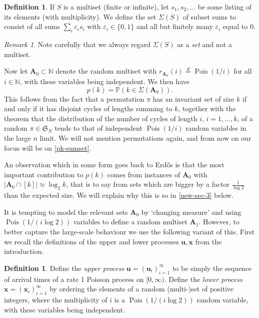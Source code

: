 \documentclass[11pt,reqno]{amsart}
\numberwithin{equation}{section}
\theoremstyle{definition}
\newtheorem{definition}[theorem]{Definition}
\theoremstyle{remark}
\newtheorem*{remark}{Remark}
\newcommand{\mb}{\mathbb}
\newcommand{\mbf}{\mathbf}
\newcommand{\mf}{\mathfrak}
\newcommand{\eps}{\varepsilon}
\newcommand\Pois{\operatorname{Pois}}
\newcommand\N{\mathbb{N}}
\newcommand\samedist{\overset{d}{=}}
\begin{document}
\begin{definition}\label{sig-tau-def} If $S$ is a multiset (finite or infinite), let $s_1, s_2,\dots$ be some listing of its elements (with multiplicity). We define the set $\Sigma(S)$ of subset sums to consist of all sums $\sum_{i} \eps_i s_i$ with $\eps_i \in \{0,1\}$ and all but finitely many $\eps_i$ equal to $0$.
\end{definition}
\begin{remark} Note carefully that we always regard $\Sigma(S)$ as a \emph{set} and not a multiset. \end{remark}
Now let $\mbf{A}_0 \subset \N$ denote the random multiset with $r_{\mbf{A}_0}(i) \samedist \Pois(1/i)$ for all $i \in \N$, with these variables being independent. We then have
\begin{equation}\label{pk-sumset}  p(k) = \mb{P} (k \in \Sigma(\mbf{A}_0)).\end{equation}
This follows from the fact that a permutation $\pi$ has an invariant set of size $k$ if and only if it has disjoint cycles of lengths summing to $k$, together with the theorem \cite{AT} that the distribution of the number of cycles of length $i$, $i = 1,\dots, k$, of a random $\pi \in \mf{S}_N$ tends to that of independent $\Pois(1/i)$ random variables in the large $n$ limit. We will not mention permutations again, and from now on our focus will be on \cref{pk-sumset}. 

An observation which in some form goes back to Erd\H{o}s \cite{erdos-mult-1} is that the most important contribution to $p(k)$ comes from instances of $\mbf{A}_0$ with $|\mbf{A}_0 \cap [k]| \approx \log_2 k$, that is to say from sets which are bigger by a factor $\frac{1}{\log 2}$ than the expected size. We will explain why this is so in \cref{new-sec-3} below.

It is tempting to model the relevant sets $\mbf{A}_0$ by `changing measure' and using $\Pois(1/(i \log 2))$ variables to define a random multiset $\mbf{A}_1$. However, to better capture the large-scale behaviour we use the following variant of this. First we recall the definitions of the upper and lower processes $\mbf{u},\mbf{x}$ from the introduction.

\begin{definition}\label{upper-lower-process-def}
Define the \emph{upper process} $\mbf{u} = (\mbf{u}_i)_{i = 1}^{\infty}$ to be simply the sequence of arrival times of a rate 1 Poisson process on $[0,\infty)$. Define the \emph{lower process} $\mbf{x} = (\mbf{x}_i)_{i = 1}^{\infty}$ by ordering the elements of a random (multi-)set of positive integers, where the multiplicity of $i$ is a $\Pois(1/(i\log 2))$ random variable, with these variables being independent. 
\end{definition}
\end{document}
